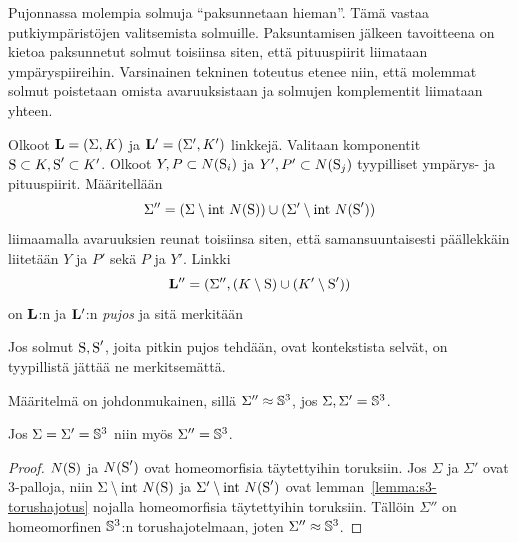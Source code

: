 Pujonnassa molempia solmuja ``paksunnetaan hieman''. Tämä vastaa putkiympäristöjen valitsemista solmuille. Paksuntamisen jälkeen tavoitteena on kietoa paksunnetut solmut toisiinsa siten, että pituuspiirit liimataan ympäryspiireihin. Varsinainen tekninen toteutus etenee niin, että molemmat solmut poistetaan omista avaruuksistaan ja solmujen komplementit liimataan yhteen.
\begin{maaritelma}
    \label{maar:pujos}
    Olkoot $\linkki=(\Sigma,K)$ ja $\linkki'=(\Sigma',K')$ linkkejä. Valitaan komponentit $\solmu\subset K,\solmu'\subset K'$. Olkoot $Y,P\subset N(\solmu_i)$ ja $Y',P'\subset N(\solmu_j)$ tyypilliset ympärys- ja pituuspiirit. Määritellään
    \begin{equation*}
        \Sigma''=(\Sigma\setminus\interior N(\solmu))\cup(\Sigma'\setminus\interior N(\solmu'))
    \end{equation*}
    liimaamalla avaruuksien reunat toisiinsa siten, että samansuuntaisesti päällekkäin liitetään $Y$ ja $P'$ sekä $P$ ja $Y'$. Linkki
    \begin{equation*}
        \linkki''=(\Sigma'',(K\setminus\solmu)\cup(K'\setminus\solmu'))
    \end{equation*}
    on $\linkki$:n ja $\linkki'$:n \emph{pujos} ja sitä merkitään
    \begin{center}
    \end{center}
    Jos solmut $\solmu,\solmu'$, joita pitkin pujos tehdään, ovat kontekstista selvät, on tyypillistä jättää ne merkitsemättä.
\end{maaritelma}
Määritelmä on johdonmukainen, sillä $\Sigma''\approx\S^3$, jos $\Sigma,\Sigma'=\S^3$.
\begin{seuraus}
    Jos $\Sigma=\Sigma'=\S^3$ niin myös $\Sigma''=\S^3$.
\end{seuraus}
\begin{proof}
    $N(\solmu)$ ja $N(\solmu')$ ovat homeomorfisia täytettyihin toruksiin. Jos $\Sigma$ ja $\Sigma'$ ovat 3-palloja, niin $\Sigma\setminus\interior N(\solmu)$ ja $\Sigma'\setminus\interior N(\solmu')$ ovat lemman~\ref{lemma:s3-torushajotus} nojalla homeomorfisia täytettyihin toruksiin. Tällöin $\Sigma''$ on homeomorfinen $\S^3$:n torushajotelmaan, joten $\Sigma''\approx\S^3$.
\end{proof}
